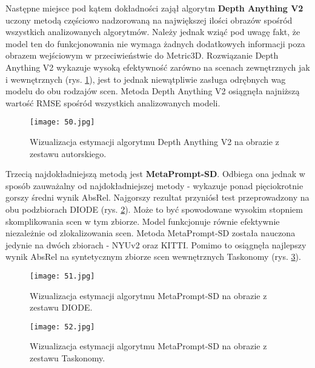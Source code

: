 Następne miejsce pod kątem dokładności zajął algorytm \textbf{Depth Anything V2} uczony metodą częściowo nadzorowaną na największej ilości obrazów spośród wszystkich analizowanych algorytmów. Należy jednak wziąć pod uwagę fakt, że model ten do funkcjonowania nie wymaga żadnych dodatkowych informacji poza obrazem wejściowym w przeciwieństwie do Metric3D. Rozwiązanie Depth Anything V2 wykazuje wysoką efektywność zarówno na scenach zewnętrznych jak i wewnętrznych (rys. \ref{fig:depthanything-stray}), jest to jednak niewątpliwie zasługa odrębnych wag modelu do obu rodzajów scen. Metoda Depth Anything V2 osiągnęła najniższą wartość RMSE spośród wszystkich analizowanych modeli.
\begin{figure}[H]
    \centering
    \texttt{[image: 50.jpg]}
    \caption{Wizualizacja estymacji algorytmu Depth Anything V2 na obrazie z zestawu autorskiego.}
    \label{fig:depthanything-stray}
\end{figure}

Trzecią najdokładniejszą metodą jest \textbf{MetaPrompt-SD}. Odbiega ona jednak w sposób zauważalny od najdokładniejszej metody - wykazuje ponad pięciokrotnie gorszy średni wynik AbsRel. Najgorszy rezultat przyniósł test przeprowadzony na obu podzbiorach DIODE (rys. \ref{fig:metaprompt-diode}). Może to być spowodowane wysokim stopniem skomplikowania scen w tym zbiorze. Model funkcjonuje równie efektywnie niezależnie od zlokalizowania scen. Metoda MetaPrompt-SD została nauczona jedynie na dwóch zbiorach - NYUv2 oraz KITTI. Pomimo to osiągnęła najlepszy wynik AbsRel na syntetycznym zbiorze scen wewnętrznych Taskonomy (rys. \ref{fig:metaprompt-taskonomy}).
\begin{figure}[H]
    \centering
    \texttt{[image: 51.jpg]}
    \caption{Wizualizacja estymacji algorytmu MetaPrompt-SD na obrazie z zestawu DIODE.}
    \label{fig:metaprompt-diode}
\end{figure}
\begin{figure}[H]
    \centering
    \texttt{[image: 52.jpg]}
    \caption{Wizualizacja estymacji algorytmu MetaPrompt-SD na obrazie z zestawu Taskonomy.}
    \label{fig:metaprompt-taskonomy}
\end{figure}

